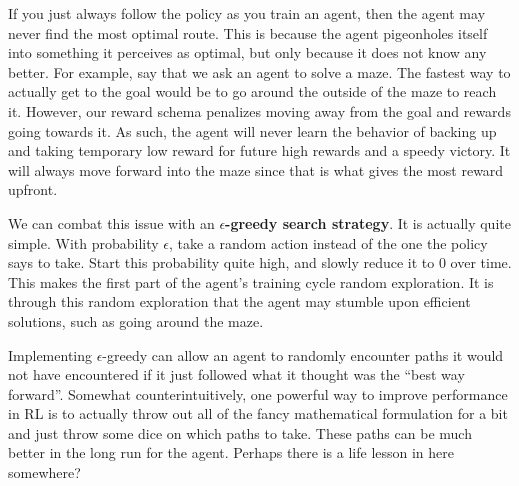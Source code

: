     If you just always follow the policy as you train an agent, then the agent may never find the most optimal route. This is because the agent pigeonholes itself into something it perceives as optimal, but only because it does not know any better. For example, say that we ask an agent to solve a maze. The fastest way to actually get to the goal would be to go around the outside of the maze to reach it. However, our reward schema penalizes moving away from the goal and rewards going towards it. As such, the agent will never learn the behavior of backing up and taking temporary low reward for future high rewards and a speedy victory. It will always move forward into the maze since that is what gives the most reward upfront. 

    We can combat this issue with an \textbf{$\epsilon$-greedy search strategy}. It is actually quite simple. With probability $\epsilon$, take a random action instead of the one the policy says to take. Start this probability quite high, and slowly reduce it to 0 over time. This makes the first part of the agent's training cycle random exploration. It is through this random exploration that the agent may stumble upon efficient solutions, such as going around the maze. 
    
    Implementing $\epsilon$-greedy can allow an agent to randomly encounter paths it would not have encountered if it just followed what it thought was the ``best way forward''. Somewhat counterintuitively, one powerful way to improve performance in RL is to actually throw out all of the fancy mathematical formulation for a bit and just throw some dice on which paths to take. These paths can be much better in the long run for the agent. Perhaps there is a life lesson in here somewhere?

